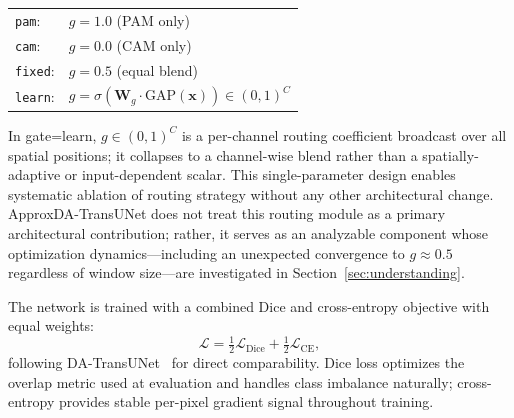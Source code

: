 \begin{center}
\small
\begin{tabular}{@{}ll@{}}
\texttt{pam}:   & $g = 1.0$ \quad (PAM only) \\
\texttt{cam}:   & $g = 0.0$ \quad (CAM only) \\
\texttt{fixed}: & $g = 0.5$ \quad (equal blend) \\
\texttt{learn}: & $g = \sigma(\mathbf{W}_g \cdot \mathrm{GAP}(\mathbf{x})) \in (0,1)^C$ \\
\end{tabular}
\end{center}

In gate=learn, $g \in (0,1)^C$ is a per-channel routing coefficient broadcast over all spatial positions; it collapses to a channel-wise blend rather than a spatially-adaptive or input-dependent scalar. This single-parameter design enables systematic ablation of routing strategy without any other architectural change. ApproxDA-TransUNet does not treat this routing module as a primary architectural contribution; rather, it serves as an analyzable component whose optimization dynamics---including an unexpected convergence to $g{\approx}0.5$ regardless of window size---are investigated in Section~\ref{sec:understanding}.

The network is trained with a combined Dice and cross-entropy objective with equal weights:
\begin{equation}
  \mathcal{L} = \tfrac{1}{2}\mathcal{L}_{\text{Dice}} + \tfrac{1}{2}\mathcal{L}_{\text{CE}},
  \label{eq:loss}
\end{equation}
following DA-TransUNet~\cite{sun2024datransunet} for direct comparability. Dice loss optimizes the overlap metric used at evaluation and handles class imbalance naturally; cross-entropy provides stable per-pixel gradient signal throughout training.

